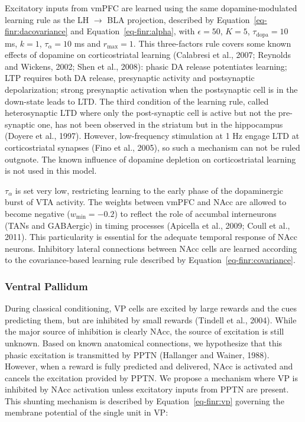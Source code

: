 \documentclass[
  11pt,
  a4paper,
]{scrbook}
\begin{document}
Excitatory inputs from vmPFC are learned using the same
dopamine-modulated learning rule as the LH \(\rightarrow\) BLA
projection, described by Equation~\ref{eq-finr:dacovariance} and
Equation~\ref{eq-finr:alpha}, with \(\epsilon=50\), \(K=5\),
\(\tau_{\text{dopa}}=10\) ms, \(k=1\), \(\tau_{\alpha}=10\) ms and
\(r_{\text{max}} = 1\). This three-factors rule covers some known
effects of dopamine on corticostriatal learning (Calabresi et al., 2007;
Reynolds and Wickens, 2002; Shen et al., 2008): phasic DA release
potentiates learning; LTP requires both DA release, presynaptic activity
and postsynaptic depolarization; strong presynaptic activation when the
postsynaptic cell is in the down-state leads to LTD. The third condition
of the learning rule, called heterosynaptic LTD where only the
post-synaptic cell is active but not the pre-synaptic one, has not been
observed in the striatum but in the hippocampus (Doyere et al., 1997).
However, low-frequency stimulation at 1 Hz engage LTD at corticostriatal
synapses (Fino et al., 2005), so such a mechanism can not be ruled
outgnote. The known influence of dopamine depletion on corticostriatal
learning is not used in this model.

\(\tau_{\alpha}\) is set very low, restricting learning to the early
phase of the dopaminergic burst of VTA activity. The weights between
vmPFC and NAcc are allowed to become negative (\(w_{\text{min}}=-0.2\))
to reflect the role of accumbal interneurons (TANs and GABAergic) in
timing processes (Apicella et al., 2009; Coull et al., 2011). This
particularity is essential for the adequate temporal response of NAcc
neurons. Inhibitory lateral connections between NAcc cells are learned
according to the covariance-based learning rule described by
Equation~\ref{eq-finr:covariance}.

\subsubsection*{Ventral Pallidum}\label{ventral-pallidum}

During classical conditioning, VP cells are excited by large rewards and
the cues predicting them, but are inhibited by small rewards (Tindell et
al., 2004). While the major source of inhibition is clearly NAcc, the
source of excitation is still unknown. Based on known anatomical
connections, we hypothesize that this phasic excitation is transmitted
by PPTN (Hallanger and Wainer, 1988). However, when a reward is fully
predicted and delivered, NAcc is activated and cancels the excitation
provided by PPTN. We propose a mechanism where VP is inhibited by NAcc
activation unless excitatory inputs from PPTN are present. This shunting
mechanism is described by Equation~\ref{eq-finr:vp} governing the
membrane potential of the single unit in VP:
\end{document}

